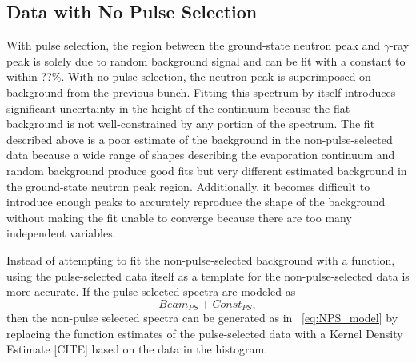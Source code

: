\subsection{Data with No Pulse Selection}
With pulse selection, the region between the ground-state neutron peak and $\gamma$-ray peak is solely due to random background signal and can be fit with a constant to within ??\%.  With no pulse selection, the neutron peak is superimposed on background from the previous bunch.  Fitting this spectrum by itself introduces significant uncertainty in the height of the continuum because the flat background is not well-constrained by any portion of the spectrum.  The fit described above is a poor estimate of the background in the non-pulse-selected data because a wide range of shapes describing the evaporation continuum and random background produce good fits but very different estimated background in the ground-state neutron peak region.  Additionally, it becomes difficult to introduce enough peaks to accurately reproduce the shape of the background without making the fit unable to converge because there are too many independent variables. 

Instead of attempting to fit the non-pulse-selected background with a function, using the pulse-selected data itself as a template for the non-pulse-selected data is more accurate.  If the pulse-selected spectra are modeled as
\begin{equation}
Beam_{PS} + Const_{PS},
\end{equation}
then the non-pulse selected spectra can be generated as in {\eqn}~\ref{eq:NPS_model} by replacing the function estimates of the pulse-selected data with a Kernel Density Estimate [CITE] based on the data in the histogram.  

